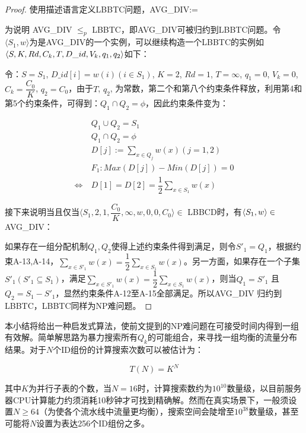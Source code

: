 \begin{proof}
	使用描述语言定义LBBTC问题，AVG\_DIV:=
	
	为说明 AVG\_DIV $\leq_p$ LBBTC，即AVG\_DIV可被归约到LBBTC问题。令$\langle S_1, w \rangle$为是AVG\_DIV的一个实例，可以继续构造一个LBBTC的实例如 $\langle  S, K, Rd, C_k, T, D\_id,\\ V_k, 
	q_1, q_2\rangle$如下：
	
	令：$S = S_1$,
	$D\_id[i] = w(i) (i \in S_1)$,
	$K = 2$, 
	$Rd = 1$,
	$T = \infty$, 
	$q_1 = 0$,
	$V_k = 0$, $C_{k}=\dfrac {C_{0}}{K}$, $q_2 = C_0$，由于$T$, $q_2$, 为常数，第二个和第八个约束条件释放，利用第4和第5个约束条件，可得到：$Q_1 \cap Q_2=\phi$，因此约束条件变为：
	
	
	\begin{align}\label{a4}
	&Q_1 \cup Q_2=S_1  \\
	&Q_1 \cap Q_2=\phi  \\
	&D\left[ j\right] :=\sum _{x\in Q_{j}}w(x) \left( j=1,2\right)\\
	&F_1:Max(D[j])-Min(D[j])=0 \nonumber \\
	\Leftrightarrow \ &D[1]=D[2]=\dfrac{1}{2}\sum_{x\in S_1}w(x) 
	\end{align}
	
	接下来说明当且仅当$\langle S_1, 2, 1, \dfrac {C_0}{K}, \infty, w, 0, 0, C_0 \rangle \in $ LBBCD时，有$\langle S_1, w\rangle \\
	\in $ AVG\_DIV：
	
	如果存在一组分配机制${Q_1, Q_2}$使得上述约束条件得到满足，则令$S'_1=Q_1$，根据约束A-13,A-14，$\sum_{x\in S'_1}w(x)=\dfrac{1}{2}\sum _{x \in S_1}w(x)$。另一方面，如果存在一个子集$S'_1( S'_1 \subseteq S_1)$，满足$\sum_{x\in S'_1}w(x)=\dfrac{1}{2}\sum _{x \in S_1}w(x)$，则当$Q_1=S'_1$ 且 $Q_2=S_1-S'_1$，显然约束条件A-12至A-15全部满足。所以AVG\_DIV 归约到LBBTC，LBBTC同样为NP难问题。
\end{proof}



\label{chap46}

本小结将给出一种启发式算法，使前文提到的NP难问题在可接受时间内得到一组有效解。简单解思路为暴力搜索所有$Q_k$的可能组合，来寻找一组均衡的流量分布结果。对于$N$个ID组份的计算搜索次数可以被估计为：

\begin{equation}
	T(N)=K^N
\end{equation}

其中$K$为并行子表的个数，当$N=16$时，计算搜索数约为$10^{10}$数量级，以目前服务器CPU计算能力约须消耗10秒钟才可找到精确解。然而在真实场景下，一般须设置$N\geq 64$（为使各个流水线中流量更均衡），搜索空间会陡增至$10^{38}$数量级，甚至可能将$N$设置为表达256个ID组份之多。


